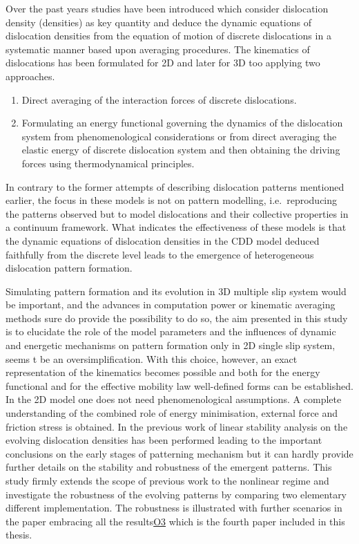 Over the past years studies have been introduced which consider dislocation density (densities) as key quantity and deduce the dynamic equations of dislocation densities from the equation of motion of discrete dislocations in a systematic manner based upon averaging procedures. The kinematics of dislocations has been formulated for 2D and later for 3D too\cite{hochrainer2007three,hochrainer2014continuum,hochrainer2015multipole}
 applying two approaches.
 \begin{enumerate}
 \item Direct averaging of the interaction forces of discrete dislocations\cite{Groma_2003_AM,valdenaire2016density,PhysRevB.93.214110}.
 \item Formulating an energy functional governing the dynamics of the dislocation system from phenomenological considerations\cite{groma2007dynamics,PhysRevLett.114.015503} or from direct averaging the elastic energy of discrete dislocation system \cite{PhysRevB.92.174120} and then obtaining the driving forces using thermodynamical principles\cite{HOCHRAINER201612}.
 \end{enumerate}
In contrary to the former attempts of describing dislocation patterns mentioned earlier, the focus in these models is not on pattern modelling, i.e.\ reproducing the patterns observed but to model dislocations and their collective properties in a continuum framework. What indicates the effectiveness of these models is that the dynamic equations of dislocation densities in the CDD model deduced faithfully from the discrete level leads to the emergence of heterogeneous dislocation pattern formation.

Simulating pattern formation and its evolution in 3D multiple slip system would be important, and the advances in computation power\cite{Xia_2015_MSMSE} or kinematic averaging methods\cite{sandfeld2015pattern} sure do provide the possibility to do so, the aim presented in this study is to elucidate the role of the model parameters and the influences of dynamic and energetic mechanisms on pattern formation only in 2D single slip system, seems t be an oversimplification. With this choice, however, an exact representation of the kinematics becomes possible and both for the energy functional \cite{groma2007dynamics,PhysRevB.92.174120} and for the effective mobility law\cite{PhysRevB.93.214110} well-defined forms can be established. In the 2D model one does not need phenomenological assumptions. A complete understanding of the combined role of energy minimisation, external force and  friction stress is obtained. In the previous work of \citet{PhysRevB.93.214110} linear stability analysis on the evolving dislocation densities has been performed leading to the important conclusions on the early stages of patterning mechanism but it can hardly provide further details on the stability and robustness of the emergent patterns. This study firmly extends the scope of previous work to the nonlinear regime and investigate the robustness of the evolving patterns by comparing two elementary different implementation. The robustness is illustrated with further scenarios in the paper embracing all the results\hyperref[paper:A4]{O3} which is the fourth paper included in this thesis.

